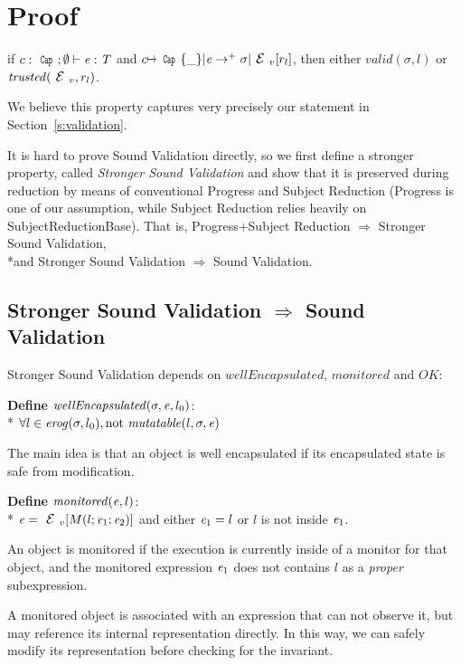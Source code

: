 \appendix
\section{Proof} 
\label{s:proof}

\begin{theorem}
	if $c:\Kw{Cap};\emptyset\vdash \e: \T$ and
	$c\mapsto\Kw{Cap}\{\_\}|\e\rightarrow^+ \sigma|\ctx_v[r_l]$, then
	either $valid(\sigma,l)$ or $\mathit{trusted}(\ctx_v,r_l)$.
\end{theorem}

We believe this property captures very precisely our statement in Section~\ref{s:validation}.

It is hard to prove Sound Validation directly,
so we first define a stronger property,
called \emph{Stronger Sound Validation} and
show that it is preserved during reduction by means of conventional 
Progress and Subject Reduction (Progress is one of our assumption,
while Subject Reduction relies heavily on SubjectReductionBase).
That is,
Progress+Subject Reduction $\Rightarrow$ Stronger Sound Validation,
\\*and Stronger Sound Validation $\Rightarrow$ Sound Validation.

\subsection{Stronger Sound Validation $\Rightarrow$ Sound Validation}

Stronger Sound Validation depends on 
$\mathit{wellEncapsulated}$, $\mathit{monitored}$
and $OK$:

\noindent\textbf{Define} $\mathit{wellEncapsulated}(\sigma,\e,l_0)$:\\*
\indent$\forall l \in \mathit{erog}(\sigma,l_0), \text{not}\ \mathit{mutatable}(l,\sigma,\e)$

\noindent The main idea is that an object is well encapsulated if its encapsulated state is safe from
modification. 

\noindent\textbf{Define} $\mathit{monitored}({\mathit{e}},l)$:\\*
\indent$\e=\ctx_v[M(l;\e_1;\e_2)]$ and either ${\mathit{e}}_1=l$ or $l$ is not inside ${\mathit{e}}_1$.

\noindent An object is monitored if the execution
is currently inside of a monitor for that object, and
the monitored expression ${\mathit{e}}_1$ does not
contains $l$ as a \emph{proper} subexpression.

A monitored object is associated with an expression that can not observe it, but may 
reference its internal representation directly.
In this way, we can safely modify its representation before checking for the invariant.

